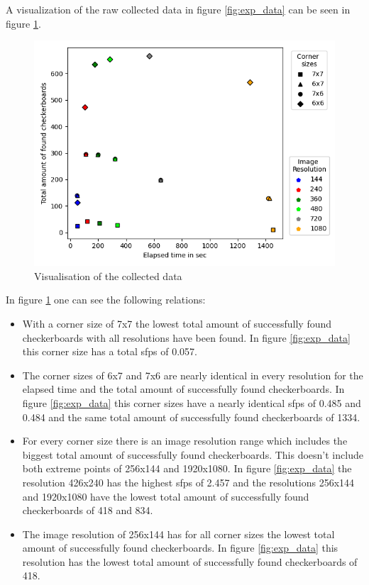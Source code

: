 A visualization of the raw collected data in figure \ref{fig:exp_data} can be seen in figure \ref{fig:exp}.

\begin{figure}[H]
    \centering
    \includegraphics[width=.8\textwidth]{image/2/experiment.png}
    \caption{Visualisation of the collected data}
    \label{fig:exp}
\end{figure}

In figure \ref{fig:exp} one can see the following relations:
\begin{itemize}
    \item With a corner size of 7x7 the lowest total amount of successfully found checkerboards with all resolutions have been found. In figure \ref{fig:exp_data} this corner size has a total sfps of 0.057.
    \item The corner sizes of 6x7 and 7x6 are nearly identical in every resolution for the elapsed time and the total amount of successfully found checkerboards. In figure \ref{fig:exp_data} this corner sizes have a nearly identical sfps of 0.485 and 0.484 and the same total amount of successfully found checkerboards of 1334.
    \item For every corner size there is an image resolution range which includes the biggest total amount of successfully found checkerboards. This doesn't include both extreme points of 256x144 and 1920x1080. In figure \ref{fig:exp_data} the resolution 426x240 has the highest sfps of 2.457 and the resolutions 256x144 and 1920x1080 have the lowest total amount of successfully found checkerboards of 418 and 834.
    \item The image resolution of 256x144 has for all corner sizes the lowest total amount of successfully found checkerboards. In figure \ref{fig:exp_data} this resolution has the lowest total amount of successfully found checkerboards of 418.
\end{itemize}

